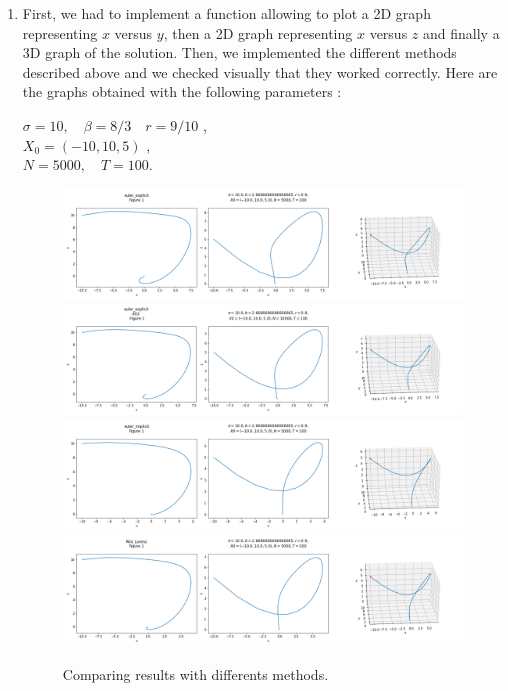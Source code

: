 \documentclass[12pt]{article}
\begin{document}
	\begin{enumerate}[label=\textbullet]
		\item First, we had to implement a function allowing to plot a 2D graph representing $x$ versus $y$, then a 2D graph representing $x$ versus $z$ and finally a 3D graph of the solution. Then, we implemented the different methods described above and we checked visually that they worked correctly. Here are the graphs obtained with the following parameters :
		\begin{center}
			$\sigma=10,\quad \beta=8/3 \quad r=9/10$ ,\\
			$X_0=(-10,10,5)$ ,\\
			$N=5000, \quad T=100 .$
		\end{center}
		\begin{figure}
			\centering
			\caption{Comparing results with differents methods.}
			\includegraphics[width=\textwidth]{"images/euler_explicit.png"}
			\includegraphics[width=\textwidth]{"images/euler_explicit_dt2.png"}
			\includegraphics[width=\textwidth]{"images/euler_implicit.png"}
			\includegraphics[width=\textwidth]{"images/RK4_Lorenz.png"}

\end{figure}
\end{enumerate}
\end{document}
